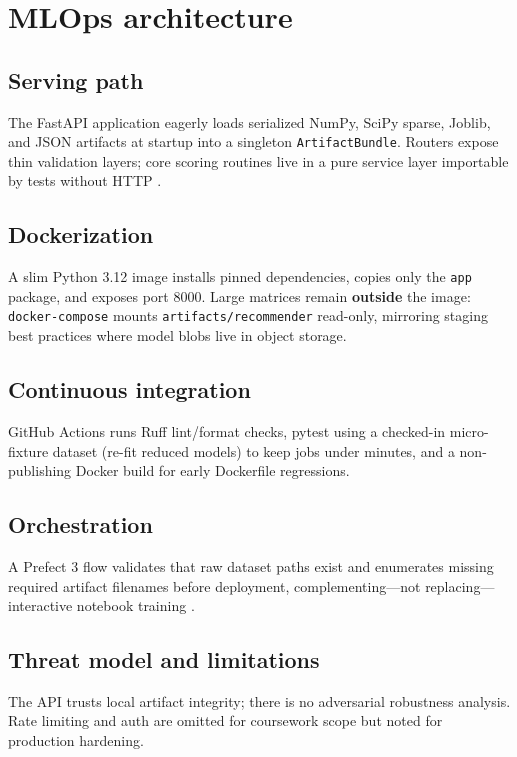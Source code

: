 \section{MLOps architecture}
\subsection{Serving path}
The FastAPI application eagerly loads serialized NumPy, SciPy sparse, Joblib, and JSON artifacts at startup into a singleton \texttt{ArtifactBundle}. Routers expose thin validation layers; core scoring routines live in a pure service layer importable by tests without HTTP \cite{fastapi}.

\subsection{Dockerization}
A slim Python 3.12 image installs pinned dependencies, copies only the \texttt{app} package, and exposes port 8000. Large matrices remain \textbf{outside} the image: \texttt{docker-compose} mounts \texttt{artifacts/recommender} read-only, mirroring staging best practices where model blobs live in object storage.

\subsection{Continuous integration}
GitHub Actions runs Ruff lint/format checks, pytest using a checked-in micro-fixture dataset (re-fit reduced models) to keep jobs under minutes, and a non-publishing Docker build for early Dockerfile regressions.

\subsection{Orchestration}
A Prefect 3 flow validates that raw dataset paths exist and enumerates missing required artifact filenames before deployment, complementing---not replacing---interactive notebook training \cite{prefect}.

\subsection{Threat model and limitations}
The API trusts local artifact integrity; there is no adversarial robustness analysis. Rate limiting and auth are omitted for coursework scope but noted for production hardening.
